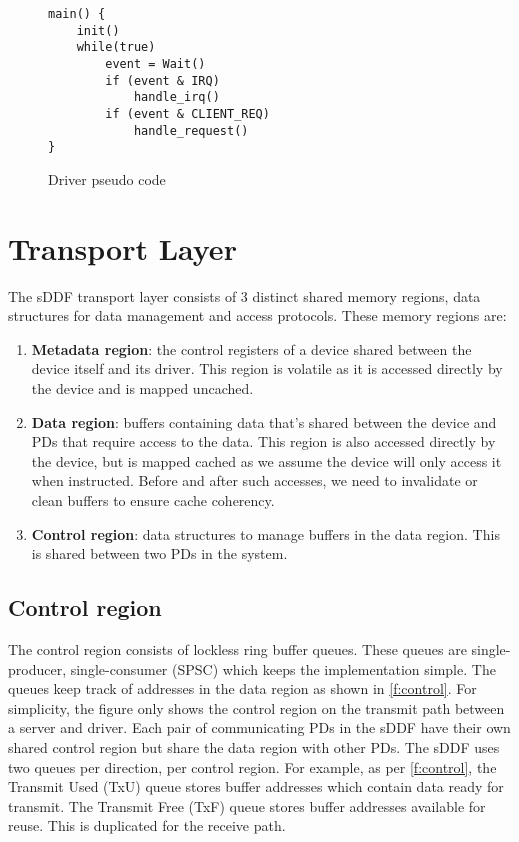 \begin{figure} [H]
\begin{verbatim}
main() {
    init()
    while(true)
        event = Wait()
        if (event & IRQ)
            handle_irq()
        if (event & CLIENT_REQ)
            handle_request()
}
\end{verbatim}
\caption{Driver pseudo code}
\label{l:driver_pseudo}
\end{figure}

\section{Transport Layer}
The sDDF transport layer consists of 3 distinct shared memory regions, data structures for data management
and access protocols. These memory regions are:
\begin{enumerate}
    \item \textbf{Metadata region}: the control registers of a device shared between the device itself and its driver. 
    This region is volatile as it is accessed directly by the device and is mapped uncached. 
    \item \textbf{Data region}: buffers containing data that's shared between the device and PDs that require access to the data.
    This region is also accessed directly by the device, but is mapped cached as we assume the device will only access it when 
    instructed. Before and after such accesses, we need to invalidate or clean buffers to ensure cache coherency.
    \item \textbf{Control region}: data structures to manage buffers in the data region. This is shared between two PDs in the system. 
\end{enumerate}

\subsection{Control region}
The control region consists of lockless ring buffer queues. These queues are single-producer,
single-consumer (SPSC) which keeps the implementation simple.
The queues keep track of addresses in the data region as shown in \autoref{f:control}. For simplicity,
the figure only shows the control region on the transmit path between a server and driver. Each pair of 
communicating PDs in the sDDF have their own shared control region but share the data region with other PDs. 
The sDDF uses two queues per direction, per control region. For example, as per \autoref{f:control}, the 
Transmit Used (TxU) queue stores buffer addresses which contain data ready for transmit. 
The Transmit Free (TxF) queue stores buffer addresses available for reuse. This is duplicated for the receive path.

